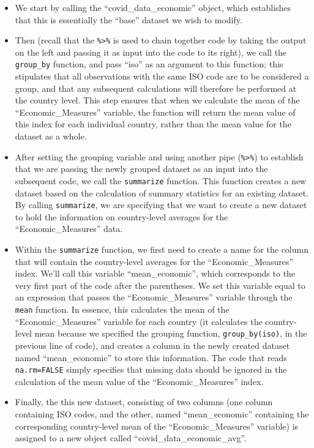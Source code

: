 \documentclass[
]{article}
\providecommand{\tightlist}{%
  \setlength{\itemsep}{0pt}\setlength{\parskip}{0pt}}
\begin{document}
\begin{itemize}
\tightlist
\item
  We start by calling the ``covid\_data\_economic'' object, which establishes that this is essentially the ``base'' dataset we wish to modify.
\item
  Then (recall that the \texttt{\%\textgreater{}\%} is used to chain together code by taking the output on the left and passing it as input into the code to its right), we call the \texttt{group\_by} function, and pass ``iso'' as an argument to this function; this stipulates that all observations with the same ISO code are to be considered a group, and that any subsequent calculations will therefore be performed at the country level. This step ensures that when we calculate the mean of the ``Economic\_Measures'' variable, the function will return the mean value of this index for each individual country, rather than the mean value for the dataset as a whole.
\item
  After setting the grouping variable and using another pipe (\texttt{\%\textgreater{}\%}) to establish that we are passing the newly grouped dataset as an input into the subsequent code, we call the \texttt{summarize} function. This function creates a new dataset based on the calculation of summary statistics for an existing dataset. By calling \texttt{summarize}, we are specifying that we want to create a new dataset to hold the information on country-level averages for the ``Economic\_Measures'' data.
\item
  Within the \texttt{summarize} function, we first need to create a name for the column that will contain the country-level averages for the ``Economic\_Measures'' index. We'll call this variable ``mean\_economic'', which corresponds to the very first part of the code after the parentheses. We set this variable equal to an expression that passes the ``Economic\_Measures'' variable through the \texttt{mean} function. In essence, this calculates the mean of the ``Economic\_Measures'' variable for each country (it calculates the country-level mean because we specified the grouping function, \texttt{group\_by(iso)}, in the previous line of code), and creates a column in the newly created dataset named ``mean\_economic'' to store this information. The code that reads \texttt{na.rm=FALSE} simply specifies that missing data should be ignored in the calculation of the mean value of the ``Economic\_Measures'' index.
\item
  Finally, the this new dataset, consisting of two columns (one column containing ISO codes, and the other, named ``mean\_economic'' containing the corresponding country-level mean of the ``Economic\_Measures'' variable) is assigned to a new object called ``covid\_data\_economic\_avg''.
\end{itemize}
\end{document}
